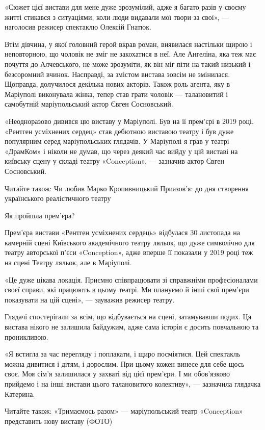 «Сюжет цієї вистави для мене дуже зрозумілий, адже я багато разів у своєму
житті стикався з ситуаціями, коли люди видавали мої твори за свої», — наголосив
режисер спектаклю Олексій Гнатюк.

Втім дівчина, у якої головний герой вкрав роман, виявилася настільки щирою і
неповторною, що чоловік не зміг не закохатися в неї. Але Ангеліна, яка теж має
почуття до Алчевського, не може зрозуміти, як він міг піти на такий низький і
безсоромний вчинок. Насправді, за змістом вистава зовсім не змінилася.
Щоправда, долучилося декілька нових акторів. Також роль агента, яку в Маріуполі
виконувала жінка, тепер став грати чоловік — талановитий і самобутній
маріупольський актор Євген Сосновський.

«Неодноразово дивився цю виставу у Маріуполі. Був на її прем'єрі в 2019 році.
«Рентген усміхнених сердец» став дебютною виставою театру і був дуже популярним
серед маріупольських глядачів. У Маріуполі я грав у театрі «ДрамКом» і ніколи
не думав, що через деякий час вийду у цій виставі на київську сцену у складі
театру «Conception», — зазначив актор Євген Сосновський.

Читайте також: Чи любив Марко Кропивницький Приазов'я: до дня створення
українського реалістичного театру

Як пройшла прем'єра?

Прем'єра вистави «Рентген усміхнених сердець» відбулася 30 листопада на
камерній сцені Київського академічного театру ляльок, що дуже символічно для
театру авторської п'єси «Conception», адже вперше її показали у 2019 році теж
на сцені Театру ляльок, але в Маріуполі.

«Це дуже цікава локація. Приємно співпрацювати зі справжніми професіоналами
своєї справи, які працюють в цьому театрі. Ми плануємо й інші свої прем'єри
показувати на цій сцені», — зауважив режисер театру.

Глядачі спостерігали за всім, що відбувається на сцені, затамувавши подих. Ця
вистава нікого не залишила байдужим, адже сама історія є досить повчальною та
проникливою.

«Я встигла за час перегляду і поплакати, і щиро посміятися. Цей спектакль можна
дивитися і дітям, і дорослим. При цьому кожен винесе для себе щось своє. Моя
сім'я залишилася у захваті від цієї прем'єри. І ми обов'язково прийдемо і на
інші вистави цього талановитого колективу», — зазначила глядачка Катерина.

Читайте також: «Тримаємось разом» — маріупольський театр «Conception» представить нову виставу (ФОТО)

